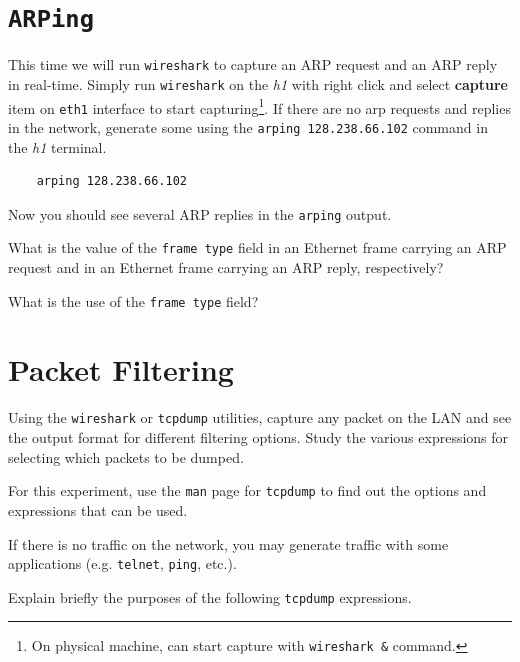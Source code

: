 \documentclass{UTNetLab}
\begin{document}
\section{\texttt{ARPing}}
This time we will run \lstinline{wireshark} to capture an ARP request and an ARP reply in real-time.
Simply run \lstinline{wireshark} on the \textit{h1} with right click and select \textbf{capture} item on \texttt{eth1} interface to start capturing\footnote{On physical machine, can start capture with \lstinline{wireshark &} command.}.
If there are no arp requests and replies in the network, generate some using the \lstinline{arping 128.238.66.102} command in the \textit{h1} terminal.

\begin{lstlisting}
	arping 128.238.66.102
\end{lstlisting}

Now you should see several ARP replies in the \lstinline{arping} output.

\begin{report}
    \item What is the value of the \texttt{frame type} field in an Ethernet frame carrying an ARP request and in an Ethernet frame carrying an ARP reply, respectively?

    \item What is the use of the \texttt{frame type} field?
\end{report}

\section{Packet Filtering}
Using the \lstinline{wireshark} or \lstinline{tcpdump} utilities, capture any packet on the LAN and see the output format for different filtering options.
Study the various expressions for selecting which packets to be dumped.

For this experiment, use the \lstinline{man} page for \lstinline{tcpdump} to find out the options and expressions that can be used.

If there is no traffic on the network, you may generate traffic with some applications (e.g. \lstinline{telnet}, \lstinline{ping}, etc.).

\begin{report}
    \item Explain briefly the purposes of the following \lstinline{tcpdump} expressions.
\end{report}
\end{document}
